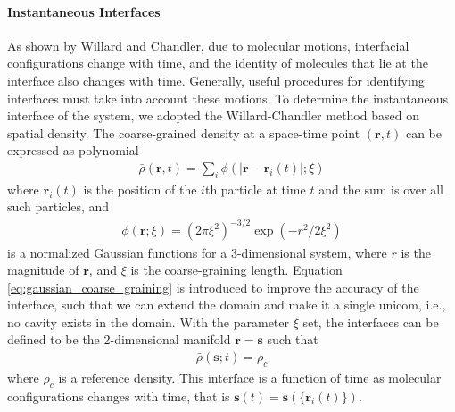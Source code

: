 \paragraph{Instantaneous Interfaces}\label{para:II}
As shown by Willard and Chandler, due to molecular motions, interfacial configurations
change with time, and the identity of molecules that lie at the interface also changes with time. 
Generally, useful procedures for identifying interfaces must take into account these motions\cite{Willard2010}. 
To determine the instantaneous interface of the system, we adopted the Willard-Chandler method based on spatial density\cite{Willard2010}.
The coarse-grained density at a space-time point $(\mathbf{r},t)$ can be expressed as polynomial
\begin{eqnarray}
\bar{\rho}(\mathbf{r}, t)=\sum_{i} \phi(|\mathbf{r}-\mathbf{r}_{i}(t)|; \xi) 
\end{eqnarray}
where ${\mathbf{r}}_i(t)$ is the position of the $i$th particle at time $t$ and the sum is over all such particles, and 
\begin{eqnarray}
\phi(\mathbf{r};\xi)=(2 \pi \xi^{2})^{-3/ 2} \exp (-r^{2} / 2 \xi^{2}) 
\label{eq:gaussian_coarse_graining}
\end{eqnarray} 
is a normalized Gaussian functions for a 3-dimensional system, where $r$ is the magnitude of ${\mathbf r}$, and $\xi$ is the coarse-graining length.
Equation \ref{eq:gaussian_coarse_graining} is introduced to improve the accuracy of the interface, such that we can extend the domain and make it a single unicom,
i.e., no cavity exists in the domain.
With the parameter $\xi$ set, the interfaces can be defined to be the 2-dimensional manifold ${\mathbf r} = {\mathbf s}$ such that
\begin{eqnarray}
\bar\rho(\mathbf{s};t)= \rho_c 
\label{eq:rho_c}
\end{eqnarray} 
where $\rho_c$ is a reference density. This interface is a function of time as molecular configurations changes with time, that is 
${\mathbf s}(t) = {\mathbf s}(\{{\mathbf r}_i(t)\})$. 

